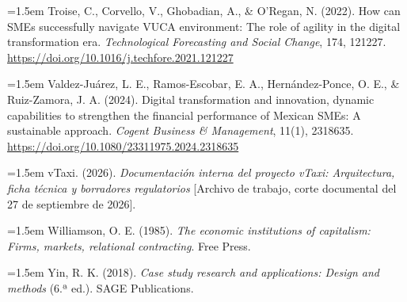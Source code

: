 {\hangindent=1.5em Troise, C., Corvello, V., Ghobadian, A., \& O'Regan, N. (2022). How can SMEs successfully navigate VUCA environment: The role of agility in the digital transformation era. \textit{Technological Forecasting and Social Change}, 174, 121227. \url{https://doi.org/10.1016/j.techfore.2021.121227}

\hangindent=1.5em Valdez-Juárez, L. E., Ramos-Escobar, E. A., Hernández-Ponce, O. E., \& Ruiz-Zamora, J. A. (2024). Digital transformation and innovation, dynamic capabilities to strengthen the financial performance of Mexican SMEs: A sustainable approach. \textit{Cogent Business \& Management}, 11(1), 2318635. \url{https://doi.org/10.1080/23311975.2024.2318635}

\hangindent=1.5em vTaxi. (2026). \textit{Documentación interna del proyecto vTaxi: Arquitectura, ficha técnica y borradores regulatorios} [Archivo de trabajo, corte documental del 27 de septiembre de 2026].

\hangindent=1.5em Williamson, O. E. (1985). \textit{The economic institutions of capitalism: Firms, markets, relational contracting}. Free Press.

\hangindent=1.5em Yin, R. K. (2018). \textit{Case study research and applications: Design and methods} (6.ª ed.). SAGE Publications.
\endgroup

\begin{aulatexlandscape}

\end{aulatexlandscape}}
